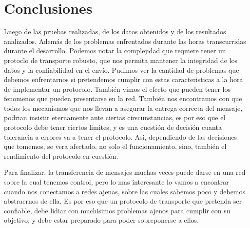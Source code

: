\section{Conclusiones}

Luego de las pruebas realizadas, de los datos obtenidos y de los resultados analizados. Adem\'as de los problemas enfrentados durante las horas transcurridas durante el desarrollo. Podemos notar la complejidad que requiere tener un protoclo de transporte robusto, que nos permita mantener la integridad de los datos y la confiabilidad en el env\'io.
Pudimos ver la cantidad de problemas que debemos enfrentarnos si pretendemos cumplir con estas caracteristicas a la hora de implementar un protocolo. Tambi\'en vimos el efecto que pueden tener los fenomenos que pueden presentarse en la red.
Tambi\'en nos encontramos con que todos los mecanismos que nos llevan a asegurar la entrega correcta del mensaje, podrian insistir eternamente ante ciertas cirscunstancias, es por eso que el protocolo debe tener ciertos limites, y es una cuesti\'on de decisi\'on cuanta tolerancia a errores va a tener el protocolo. Asi, dependiendo de las decisiones que tomemos, se vera afectado, no solo el funcionamiento, sino, tambi\'en el rendimiento del protocolo en cuesti\'on.

Para finalizar, la transferencia de mensajes muchas veces puede darse en una red sobre la cual tenemos control, pero lo mas interesante lo vamos a encontrar cuando nos conectamos a redes ajenas, sobre las cuales sabemos poco y debemos abstraernos de ella. Es por eso que un protocolo de transporte que pretenda ser confiable, debe lidiar con muchisimos problemas ajenos para cumplir con su objetivo, y debe estar preparado para poder sobreponerse a ellos.